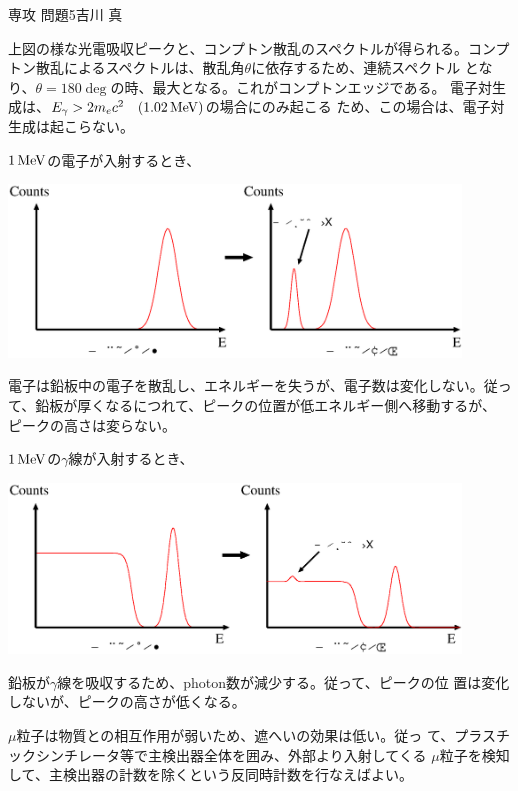 \documentclass[fleqn]{jbook}
\begin{document}
\begin{answer}{専攻 問題5}{吉川 真}
\begin{subanswers}
  上図の様な光電吸収ピークと、コンプトン散乱のスペクトルが得られる。コンプ
  トン散乱によるスペクトルは、散乱角$\theta$に依存するため、連続スペクトル
  となり、$\theta=180\deg$の時、最大となる。これがコンプトンエッジである。
  電子対生成は、$E_\gamma>2m_ec^2\quad(1.02\,{\rm MeV})$の場合にのみ起こる
  ため、この場合は、電子対生成は起こらない。

  \SubAnswer
  \begin{subsubanswers}
   \SubSubAnswer $1\,{\rm MeV}$の電子が入射するとき、
   \begin{center}
    \includegraphics[width=12cm,clip]{1999phy5-5.eps}
   \end{center}
   
   電子は鉛板中の電子を散乱し、エネルギーを失うが、電子数は変化しない。従っ
   て、鉛板が厚くなるにつれて、ピークの位置が低エネルギー側へ移動するが、
   ピークの高さは変らない。

   \SubSubAnswer $1\,{\rm MeV}$の$\gamma$線が入射するとき、
   \begin{center}
    \includegraphics[width=12cm,clip]{1999phy5-6.eps}
   \end{center}

   鉛板が$\gamma$線を吸収するため、photon数が減少する。従って、ピークの位
   置は変化しないが、ピークの高さが低くなる。
  \end{subsubanswers} 

  \SubAnswer $\mu$粒子は物質との相互作用が弱いため、遮へいの効果は低い。従っ
  て、プラスチックシンチレータ等で主検出器全体を囲み、外部より入射してくる
  $\mu$粒子を検知して、主検出器の計数を除くという反同時計数を行なえばよい。


\end{subanswers}
\end{answer}
\end{document}
